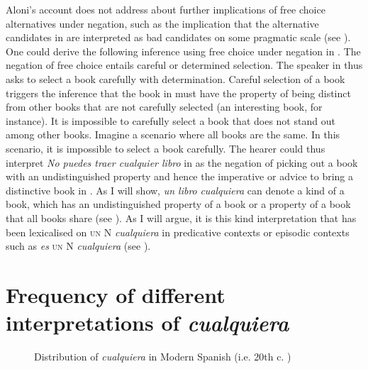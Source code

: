 Aloni’s account does not address about further implications of free choice alternatives under negation, such as the implication that the alternative candidates in  are interpreted as bad candidates on some pragmatic scale (see \citealt{Horn2000}). One could derive the following inference using free choice under negation in . The negation of free choice entails careful or determined selection. The speaker in  thus asks to select a book carefully with determination. Careful selection of a book triggers the inference that the book in  must have the property of being distinct from other books that are not carefully selected (an interesting book, for instance). It is impossible to carefully select a book that does not stand out among other books. Imagine a scenario where all books are the same. In this scenario, it is impossible to select a book carefully. The hearer could thus interpret \textit{No puedes traer cualquier libro} in  as the negation of picking out a book with an undistinguished property and hence the imperative or advice to bring a distinctive book in . As I will show, \textit{un libro} \textit{cualquiera} can denote a kind of a book, which has an undistinguished property of a book or a property of a book that all books share (see ). As I will argue, it is this kind interpretation that has been lexicalised on \textsc{un} N \textit{cualquiera} in predicative contexts or episodic contexts such as \textit{es} \textsc{un} N \textit{cualquiera} (see ).

\section{{Frequency} {of} {different} {interpretations} {of} {\textit{cualquiera}}} \label{sec:2.4}


\begin{figure}[b]

\caption{\label{fig:key:2} Distribution of \textit{cualquiera} in Modern Spanish (i.e. 20th c. \citealt[19]{AloniEtAl2010})}

\end{figure}

